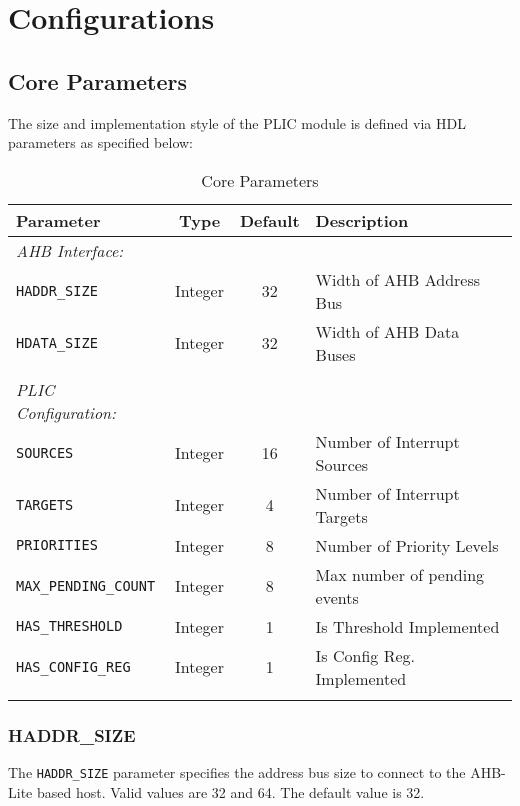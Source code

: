 \chapter{Configurations}

\hypertarget{core-parameters}{\section{Core Parameters}\label{sec:core-parameters}}

The size and implementation style of the PLIC module is defined via HDL parameters as specified below:

\begin{longtable}[c]{@{\extracolsep{\fill}}lccl@{}}	
	\toprule 
	\textbf{Parameter}           & \textbf{Type} & \textbf{Default} & \textbf{Description}\\
	\midrule
	\endhead
	\emph{AHB Interface:}\\
	\texttt{HADDR\_SIZE}         & Integer & 32 & Width of AHB Address Bus\\
	\texttt{HDATA\_SIZE}         & Integer & 32 & Width of AHB Data Buses\\
	& & & \\
	\emph{PLIC Configuration:}\\
	\texttt{SOURCES}             & Integer & 16 & Number of Interrupt Sources\\
	\texttt{TARGETS}             & Integer & 4 & Number of Interrupt Targets\\
	\texttt{PRIORITIES}          & Integer & 8 & Number of Priority Levels\\
	\texttt{MAX\_PENDING\_COUNT} & Integer & 8 & Max number of pending events\\
	\texttt{HAS\_THRESHOLD}      & Integer & 1 & Is Threshold Implemented\\
	\texttt{HAS\_CONFIG\_REG}    & Integer & 1 & Is Config Reg. Implemented\\
	\bottomrule 	
	\caption{Core Parameters}
	\label{tab:CoreParams}
\end{longtable}

\subsection{HADDR\_SIZE}

The \texttt{HADDR\_SIZE} parameter specifies the address bus size to connect to the AHB-Lite based host. Valid values are 32 and 64. The default value is 32.

